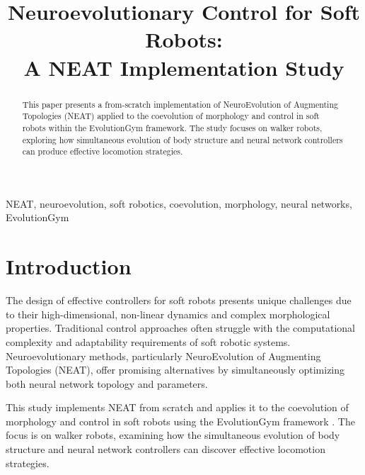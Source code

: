 \documentclass[conference]{IEEEtran}
\begin{document}
\title{Neuroevolutionary Control for Soft Robots: \\ A NEAT Implementation Study}

\author{
}

\maketitle

\begin{abstract}
This paper presents a from-scratch implementation of NeuroEvolution of Augmenting Topologies (NEAT) applied to the coevolution of morphology and control in soft robots within the EvolutionGym framework. The study focuses on walker robots, exploring how simultaneous evolution of body structure and neural network controllers can produce effective locomotion strategies.
\end{abstract}

\begin{IEEEkeywords}
NEAT, neuroevolution, soft robotics, coevolution, morphology, neural networks, EvolutionGym
\end{IEEEkeywords}

\section{Introduction}
The design of effective controllers for soft robots presents unique challenges due to their high-dimensional, non-linear dynamics and complex morphological properties. Traditional control approaches often struggle with the computational complexity and adaptability requirements of soft robotic systems. Neuroevolutionary methods, particularly NeuroEvolution of Augmenting Topologies (NEAT), offer promising alternatives by simultaneously optimizing both neural network topology and parameters.

This study implements NEAT from scratch and applies it to the coevolution of morphology and control in soft robots using the EvolutionGym framework \cite{evogym2021}. The focus is on walker robots, examining how the simultaneous evolution of body structure and neural network controllers can discover effective locomotion strategies.
\end{document}
